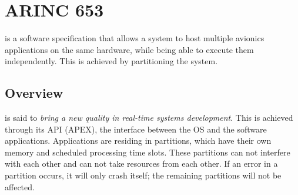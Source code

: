 \section{ARINC 653}
\arinc{} is a software specification that allows a system to host
multiple avionics applications on the same hardware, while being able
to execute them independently. This is achieved by partitioning the
system\cite{arinc_page_2}.

\subsection{Overview}
\arinc{} is said to \textit{bring a new quality in real-time systems
development}\cite{arinc_scarlett}.
This is achieved through its API (APEX), the interface between
the OS and the software applications.
Applications are residing in partitions,
which have their own memory and scheduled processing time slots.
These partitions can not interfere with each other and can
not take resources from each other.
If an error in a partition occurs, it will only crash itself;
the remaining partitions will not be affected.

